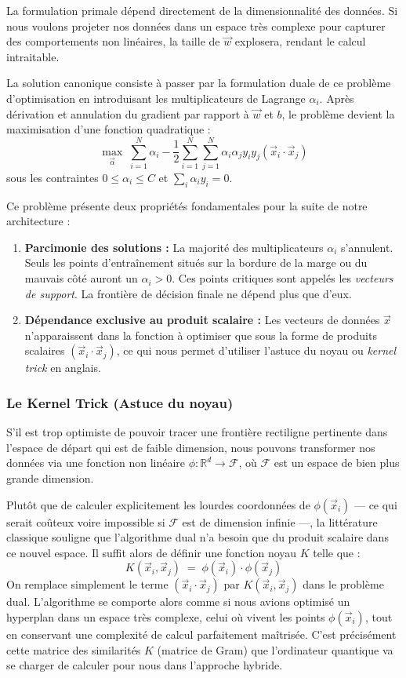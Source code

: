 \documentclass[a4paper]{article}
\begin{document}
La formulation primale dépend directement de la dimensionnalité des données. Si nous voulons projeter nos données dans un espace très complexe pour capturer des comportements non linéaires, la taille de $\vec{w}$ explosera, rendant le calcul intraitable. 

La solution canonique consiste à passer par la formulation duale de ce problème d'optimisation en introduisant les multiplicateurs de Lagrange $\alpha_i$. Après dérivation et annulation du gradient par rapport à $\vec{w}$ et $b$, le problème devient la maximisation d'une fonction quadratique :
\[
\max_{\vec{\alpha}} \; \sum_{i=1}^{N} \alpha_i - \frac{1}{2} \sum_{i=1}^{N} \sum_{j=1}^{N} \alpha_i \alpha_j y_i y_j (\vec{x}_i \cdot \vec{x}_j)
\]
sous les contraintes $0 \leq \alpha_i \leq C$ et $\sum_{i} \alpha_i y_i = 0$.

Ce problème présente deux propriétés fondamentales pour la suite de notre architecture :
\begin{enumerate}
    \item \textbf{Parcimonie des solutions :} La majorité des multiplicateurs $\alpha_i$ s'annulent. Seuls les points d'entraînement situés sur la bordure de la marge ou du mauvais côté auront un $\alpha_i > 0$. Ces points critiques sont appelés les \emph{vecteurs de support}. La frontière de décision finale ne dépend plus que d'eux.
    \item \textbf{Dépendance exclusive au produit scalaire :} Les vecteurs de données $\vec{x}$ n'apparaissent dans la fonction à optimiser que sous la forme de produits scalaires $(\vec{x}_i \cdot \vec{x}_j)$, ce qui nous permet d'utiliser l'astuce du noyau ou \emph{kernel trick} en anglais.
\end{enumerate}

\subsubsection*{Le Kernel Trick (Astuce du noyau)}

S'il est trop optimiste de pouvoir tracer une frontière rectiligne pertinente dans l'espace de départ qui est de faible dimension, nous pouvons transformer nos données via une fonction non linéaire $\phi : \mathbb{R}^d \rightarrow \mathcal{F}$, où $\mathcal{F}$ est un espace de bien plus grande dimension. 

Plutôt que de calculer explicitement les lourdes coordonnées de $\phi(\vec{x}_i)$ — ce qui serait coûteux voire impossible si $\mathcal{F}$ est de dimension infinie —, la littérature classique \cite{boser1992kernel} souligne que l'algorithme dual n'a besoin que du produit scalaire dans ce nouvel espace. Il suffit alors de définir une fonction noyau $K$ telle que :
\[
K(\vec{x}_i, \vec{x}_j) \;=\; \phi(\vec{x}_i) \cdot \phi(\vec{x}_j)
\]
On remplace simplement le terme $(\vec{x}_i \cdot \vec{x}_j)$ par $K(\vec{x}_i, \vec{x}_j)$ dans le problème dual. L'algorithme se comporte alors comme si nous avions optimisé un hyperplan dans un espace très complexe, celui où vivent les points $\phi(\vec{x}_i)$, tout en conservant une complexité de calcul parfaitement maîtrisée. C'est précisément cette matrice des similarités $K$ (matrice de Gram) que l'ordinateur quantique va se charger de calculer pour nous dans l'approche hybride.
\end{document}
